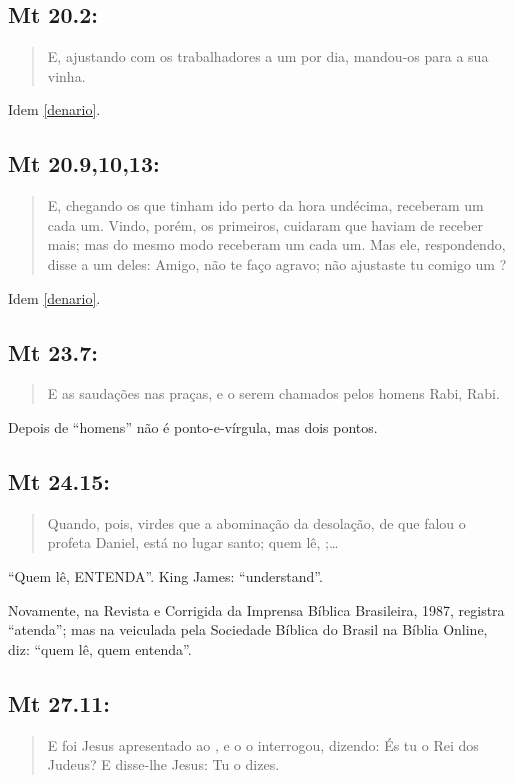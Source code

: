 \subsection*{Mt 20.2:}
\begin{quote} \small E, ajustando com os trabalhadores a um  por dia, man\-dou-os para a sua vinha.\end{quote}
Idem \ref{denario}.


\subsection*{Mt 20.9,10,13:}
\begin{quote}
 \small
 E, chegando os que tinham ido perto da hora undécima, receberam um  cada um. Vindo, porém, os primeiros, cuidaram que haviam de receber mais; mas do mesmo modo receberam um  cada um. Mas ele, respondendo, disse a um deles: Amigo, não te faço agravo; não ajustaste tu comigo um ?
\end{quote}

Idem \ref{denario}.

\subsection*{Mt 23.7:}
\begin{quote}
 \small
 E as saudações nas praças, e o serem chamados pelos homens\uwave{;} Rabi, Rabi.
\end{quote}

Depois de ``homens'' não é ponto-e-vírgula, mas dois pontos.


\subsection*{Mt 24.15:}
\begin{quote}
 \small
Quando, pois, virdes que a abominação da desolação, de
que falou o profeta Daniel, está no lugar santo; quem lê, ;\ldots
\end{quote}
``Quem lê, ENTENDA''. King James: ``understand''.

 Novamente, na Revista e Corrigida da Imprensa Bíblica Brasileira,
 1987, registra ``atenda''; mas na veiculada pela Sociedade Bíblica do
 Brasil na Bíblia Online, diz: ``quem lê, quem entenda''.

\subsection*{Mt 27.11:}\label{govern}
\begin{quote}
 \small
 E foi Jesus apresentado ao , e o  o interrogou, dizendo: És tu o Rei dos Judeus? E disse-lhe Jesus: Tu o dizes.
\end{quote}

